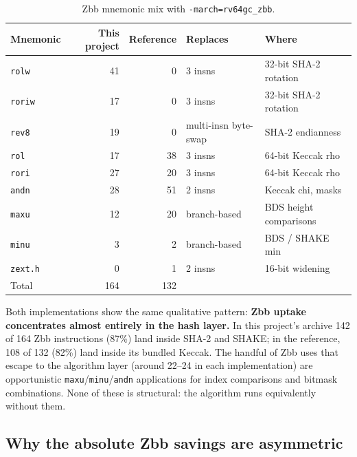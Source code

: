 \documentclass[11pt,a4paper]{article}
\begin{document}
\begin{table}[ht]
\centering
\caption{Zbb mnemonic mix with \texttt{-march=rv64gc\_zbb}.}
\label{tab:zbb-mix}
\begin{tabular}{@{}lrrlp{3.5cm}@{}}
\toprule
Mnemonic        & This project & Reference & Replaces & Where \\
\midrule
\texttt{rolw}   & 41 &  0 & 3 insns & 32-bit SHA-2 rotation \\
\texttt{roriw}  & 17 &  0 & 3 insns & 32-bit SHA-2 rotation \\
\texttt{rev8}   & 19 &  0 & multi-insn byte-swap & SHA-2 endianness \\
\texttt{rol}    & 17 & 38 & 3 insns & 64-bit Keccak rho \\
\texttt{rori}   & 27 & 20 & 3 insns & 64-bit Keccak rho \\
\texttt{andn}   & 28 & 51 & 2 insns & Keccak chi, masks \\
\texttt{maxu}   & 12 & 20 & branch-based & BDS height comparisons \\
\texttt{minu}   &  3 &  2 & branch-based & BDS / SHAKE min \\
\texttt{zext.h} &  0 &  1 & 2 insns & 16-bit widening \\
\midrule
Total           & 164 & 132 & & \\
\bottomrule
\end{tabular}
\end{table}

Both implementations show the same qualitative pattern:
\textbf{Zbb uptake concentrates almost entirely in the hash layer.} In this project's archive 142 of 164 Zbb
instructions (87\%) land inside SHA-2 and SHAKE; in the reference,
108 of 132 (82\%) land inside its bundled Keccak. The handful of Zbb
uses that escape to the algorithm layer (around 22--24 in each
implementation) are opportunistic \texttt{maxu}/\texttt{minu}/\texttt{andn}
applications for index comparisons and bitmask combinations. None
of these is structural: the algorithm runs equivalently without
them.

\subsection{Why the absolute Zbb savings are asymmetric}
\label{sec:zbb-asymmetry}
\end{document}
